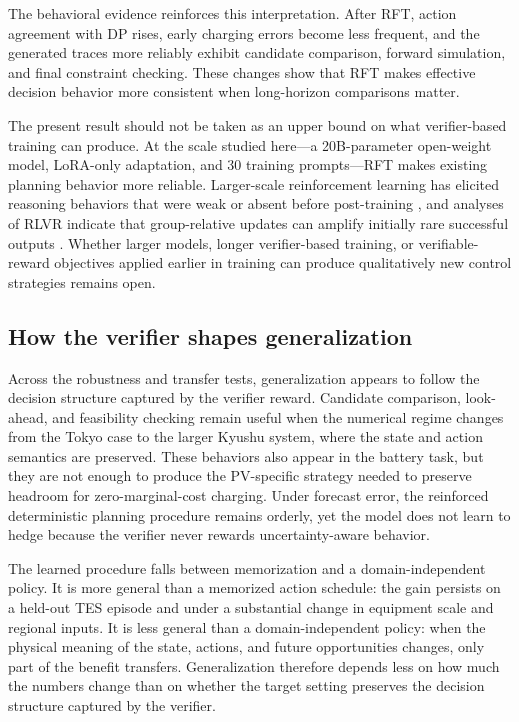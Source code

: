 \documentclass[11pt]{article}
\begin{document}
The behavioral evidence reinforces this interpretation. After RFT, action agreement with DP rises, early charging errors become less frequent, and the generated traces more reliably exhibit candidate comparison, forward simulation, and final constraint checking. These changes show that RFT makes effective decision behavior more consistent when long-horizon comparisons matter.

The present result should not be taken as an upper bound on what verifier-based training can produce. At the scale studied here---a 20B-parameter open-weight model, LoRA-only adaptation, and 30 training prompts---RFT makes existing planning behavior more reliable. Larger-scale reinforcement learning has elicited reasoning behaviors that were weak or absent before post-training \cite{ref:deepseekr1_2025}, and analyses of RLVR indicate that group-relative updates can amplify initially rare successful outputs \cite{mroueh2025rlvr}. Whether larger models, longer verifier-based training, or verifiable-reward objectives applied earlier in training can produce qualitatively new control strategies remains open.

\subsection{How the verifier shapes generalization}\label{subsec:verifier-generalization}
Across the robustness and transfer tests, generalization appears to follow the decision structure captured by the verifier reward. Candidate comparison, look-ahead, and feasibility checking remain useful when the numerical regime changes from the Tokyo case to the larger Kyushu system, where the state and action semantics are preserved. These behaviors also appear in the battery task, but they are not enough to produce the PV-specific strategy needed to preserve headroom for zero-marginal-cost charging. Under forecast error, the reinforced deterministic planning procedure remains orderly, yet the model does not learn to hedge because the verifier never rewards uncertainty-aware behavior.

The learned procedure falls between memorization and a domain-independent policy. It is more general than a memorized action schedule: the gain persists on a held-out TES episode and under a substantial change in equipment scale and regional inputs. It is less general than a domain-independent policy: when the physical meaning of the state, actions, and future opportunities changes, only part of the benefit transfers. Generalization therefore depends less on how much the numbers change than on whether the target setting preserves the decision structure captured by the verifier.
\end{document}
